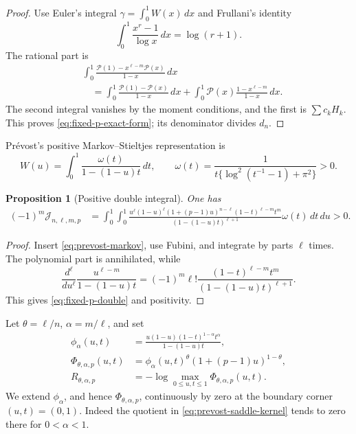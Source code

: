 \documentclass[11pt]{article}
\newtheorem{proposition}[theorem]{Proposition}
\theoremstyle{definition}
\theoremstyle{remark}
\begin{document}
\begin{proof}
Use Euler's integral \(\gamma=\int_0^1W(x)\,dx\) and Frullani's identity
\[
 \int_0^1\frac{x^r-1}{\log x}\,dx=\log(r+1).
\]
The rational part is
\begin{align*}
 &\int_0^1\frac{\mathcal P(1)-x^{\ell-m}\mathcal P(x)}{1-x}\,dx\\
 &\quad=\int_0^1\frac{\mathcal P(1)-\mathcal P(x)}{1-x}\,dx
 +\int_0^1\mathcal P(x)\frac{1-x^{\ell-m}}{1-x}\,dx.
\end{align*}
The second integral vanishes by the moment conditions, and the first is
\(\sum c_kH_k\).  This proves \eqref{eq:fixed-p-exact-form}; its denominator
divides \(d_n\).
\end{proof}

Pr\'evost's positive Markov--Stieltjes representation is
\begin{equation}\label{eq:prevost-markov}
 W(u)=\int_0^1\frac{\omega(t)}{1-(1-u)t}\,dt,
 \qquad
 \omega(t)=\frac1{t\{\log^2(t^{-1}-1)+\pi^2\}}>0.
\end{equation}

\begin{proposition}[Positive double integral]
\label{prop:fixed-p-positive}
One has
\begin{align}
 (-1)^m\mathcal J_{n,\ell,m,p}
 &=\int_0^1\!\int_0^1
 \frac{u^\ell(1-u)^\ell
 (1+(p-1)u)^{n-\ell}
 (1-t)^{\ell-m}t^m}
 {(1-(1-u)t)^{\ell+1}}
 \omega(t)\,dt\,du>0.
 \label{eq:fixed-p-double}
\end{align}
\end{proposition}

\begin{proof}
Insert \eqref{eq:prevost-markov}, use Fubini, and integrate by parts
\(\ell\) times.  The polynomial part is annihilated, while
\[
 \frac{d^\ell}{du^\ell}
 \frac{u^{\ell-m}}{1-(1-u)t}
 =(-1)^m\ell!\frac{(1-t)^{\ell-m}t^m}
 {(1-(1-u)t)^{\ell+1}}.
\]
This gives \eqref{eq:fixed-p-double} and positivity.
\end{proof}

Let \(\theta=\ell/n\), \(\alpha=m/\ell\), and set
\begin{align}
 \phi_\alpha(u,t)&=
 \frac{u(1-u)(1-t)^{1-\alpha}t^\alpha}
 {1-(1-u)t},\label{eq:prevost-saddle-kernel}\\
 \Phi_{\theta,\alpha,p}(u,t)&=
 \phi_\alpha(u,t)^\theta
 (1+(p-1)u)^{1-\theta},\label{eq:fixed-p-saddle}\\
 R_{\theta,\alpha,p}&=-\log\max_{0\le u,t\le1}
 \Phi_{\theta,\alpha,p}(u,t).
\end{align}
We extend \(\phi_\alpha\), and hence
\(\Phi_{\theta,\alpha,p}\), continuously by zero at the boundary corner
\((u,t)=(0,1)\).  Indeed the quotient in
\eqref{eq:prevost-saddle-kernel} tends to zero there for
\(0<\alpha<1\).
\end{document}
